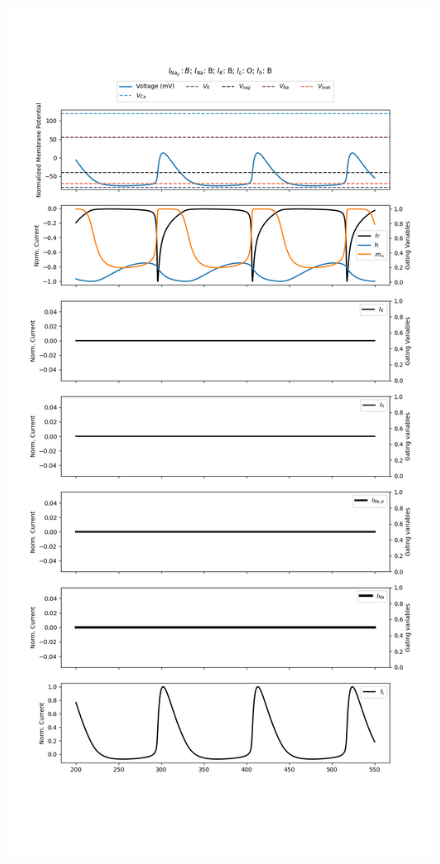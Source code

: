 \documentclass[../../workflow.tex]{subfiles}
\begin{document}
\begin{figure}[H]
    \centering
    \includegraphics[height=\textheight]{img/r5/wang1994/experiment_29.png}
\end{figure}
\end{document}
